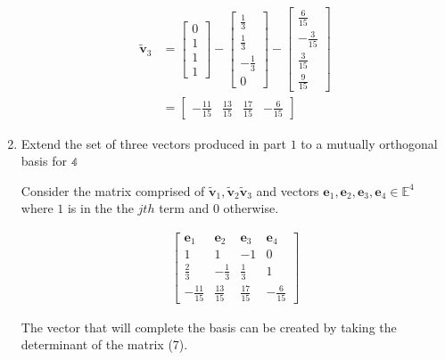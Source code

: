 \documentclass{tufte-book}
\newcommand{\vct}{\mathbf}
\theoremstyle{mytheoremstyle}
\theoremstyle{mylemstyle}
\theoremstyle{mydefstyle}
\begin{document}
\begin{enumerate}
\begin{align*}
\vct{\tilde{v}}_3 &= 
\begin{bmatrix}
0 \\
1 \\
1 \\ 
1 
\end{bmatrix}
-\begin{bmatrix}
\frac{1}{3} \\
\frac{1}{3} \\ 
-\frac{1}{3} \\
0
\end{bmatrix}
-
\begin{bmatrix}
\frac{6}{15} \\
{-\frac{3}{15}} \\ 
\frac{3}{15} \\
\frac{9}{15}
\end{bmatrix} \\
&=
\begin{bmatrix}
{-\frac{11}{15}} & \frac{13}{15} &\frac{17}{15} & {-\frac{6}{15}}
\end{bmatrix}
\end{align*}

\item Extend the set of three vectors produced in part $1$ to a mutually orthogonal basis for $\mathbb{4}$

Consider the matrix comprised of $ \vct{\tilde{v}}_1,  \vct{\tilde{v}}_2  \vct{\tilde{v}}_3$ and vectors $\vct{e}_1,\vct{e}_2,\vct{e}_3,\vct{e}_4 \in \mathbb{E}^4$ where $1$ is in the the $jth$ term and $0$ otherwise.

\begin{align}
\begin{bmatrix}
\vct{e}_1 & \vct{e}_2 & \vct{e}_3 & \vct{e}_4 \\
1 & 1 & {-1} & 0 \\
\frac{2}{3} & -\frac{1}{3} &\frac{1}{3} & 1 \\
{-\frac{11}{15}} & \frac{13}{15} &\frac{17}{15} & {-\frac{6}{15}}
\end{bmatrix}
\end{align}

The vector that will complete the basis can be created by taking the determinant of the matrix (7).
\end{enumerate} 
\end{document}
